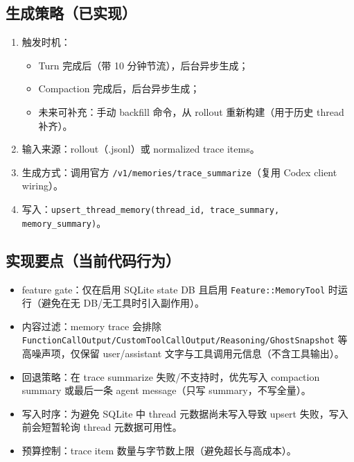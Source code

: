 \documentclass[UTF8,11pt]{ctexart}
\begin{document}
\subsection{生成策略（已实现）}
\begin{enumerate}[nosep]
  \item 触发时机：
    \begin{itemize}[nosep]
      \item Turn 完成后（带 10 分钟节流），后台异步生成；
      \item Compaction 完成后，后台异步生成；
      \item 未来可补充：手动 backfill 命令，从 rollout 重新构建（用于历史 thread 补齐）。
    \end{itemize}
  \item 输入来源：rollout（.jsonl）或 normalized trace items。
  \item 生成方式：调用官方 \texttt{/v1/memories/trace\_summarize}（复用 Codex client wiring）。
  \item 写入：\texttt{upsert\_thread\_memory(thread\_id, trace\_summary, memory\_summary)}。
\end{enumerate}

\subsection{实现要点（当前代码行为）}
\begin{itemize}[nosep]
  \item feature gate：仅在启用 SQLite state DB 且启用 \texttt{Feature::MemoryTool} 时运行（避免在无 DB/无工具时引入副作用）。
  \item 内容过滤：memory trace 会排除 \texttt{FunctionCallOutput/CustomToolCallOutput/Reasoning/GhostSnapshot} 等高噪声项，仅保留 user/assistant 文字与工具调用元信息（不含工具输出）。
  \item 回退策略：在 trace summarize 失败/不支持时，优先写入 compaction summary 或最后一条 agent message（只写 summary，不写全量）。
  \item 写入时序：为避免 SQLite 中 thread 元数据尚未写入导致 upsert 失败，写入前会短暂轮询 thread 元数据可用性。
  \item 预算控制：trace item 数量与字节数上限（避免超长与高成本）。
\end{itemize}
\end{document}
